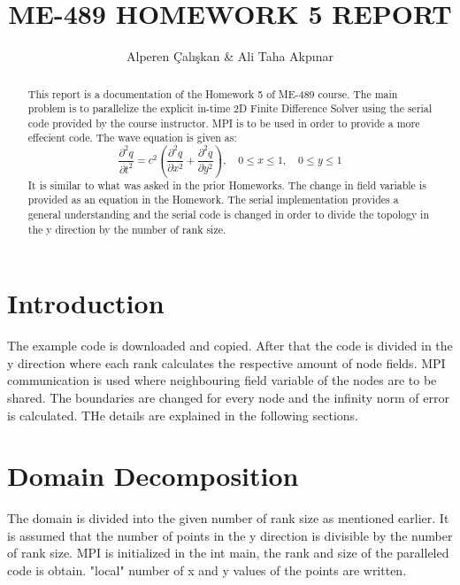 \documentclass{article}
\title{ME-489 HOMEWORK 5 REPORT}
\author{Alperen Çalışkan & Ali Taha Akpınar}
\begin{document}
\maketitle
\begin{abstract}
This report is a documentation of the Homework 5 of ME-489 course. The main problem is to parallelize the explicit in-time 2D Finite Difference Solver using the serial code provided by the course instructor. MPI is to be used in order to provide a more effecient code. The wave equation is given as:
\begin{equation}
\frac{\partial^2 q}{\partial t^2} = c^2 \left( \frac{\partial^2 q}{\partial x^2} + \frac{\partial^2 q}{\partial y^2} \right), \quad 0 \leq x \leq 1, \quad 0 \leq y \leq 1
\end{equation}
It is similar to what was asked in the prior Homeworks. The change in field variable is provided as an equation in the Homework. The serial implementation provides a general understanding and the serial code is changed in order to divide the topology in the y direction by the number of rank size.
\end{abstract}

\section{Introduction}
The example code is downloaded and copied. After that the code is divided in the y direction where each rank calculates the respective amount of node fields. MPI communication is used where neighbouring field variable of the nodes are to be shared. The boundaries are changed for every node and the infinity norm of error is calculated. THe details are explained in the following sections.

\section{Domain Decomposition}
The domain is divided into the given number of rank size as mentioned earlier. It is assumed that the number of points in the y direction is divisible by the number of rank size. MPI is initialized in the int main, the rank and size of the paralleled code is obtain. "local" number of x and y values of the points are written.
\end{document}
